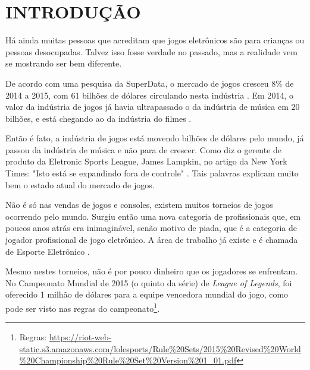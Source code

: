 \documentclass[
	12pt,					%
	openright,				%
	oneside,				%
	a4paper,				%
	bibjustif,				%
	chapter=TITLE,			%
	english,				%
	brazil,					%
	]{abntex2}
\begin{document}

\newpage %
\renewcommand*\listfigurename{LISTA DE FIGURAS}
\pdfbookmark[0]{\listfigurename}{lof}
\listoffigures*
\cleardoublepage

\newpage %
\thispagestyle{empty} %
\listoftables*
\cleardoublepage

\newpage %
\thispagestyle{empty} %
\tableofcontents*
\cleardoublepage

\textual
\newpage %
\chapter{INTRODUÇÃO}
	Há ainda muitas pessoas que acreditam que jogos eletrônicos são para crianças ou pessoas desocupadas.
	Talvez isso fosse verdade no passado, mas a realidade vem se mostrando ser bem diferente.
	
	De acordo com uma pesquisa da SuperData,
	o mercado de jogos cresceu 8\% de 2014 a 2015,
	com 61 bilhões de dólares circulando nesta indústria \cite{cnbc}.
	Em 2014, o valor da indústria de jogos já havia ultrapassado o da indústria de música em 20 bilhões,
	e está chegando ao da indústria do filmes \cite{nytimes}.
	
	Então é fato, a indústria de jogos está movendo bilhões de dólares pelo mundo,
	já passou da indústria de música e não para de crescer.
	Como diz o gerente de produto da Eletronic Sports League, James Lampkin,
	no artigo da New York Times:
	"Isto está se expandindo fora de controle"{}
	\cite[tradução nossa]{nytimes}.
	Tais palavras explicam muito bem o estado atual do mercado de jogos.
	
	Não é só nas vendas de jogos e consoles,
	existem muitos torneios de jogos ocorrendo pelo mundo.
	Surgiu então uma nova categoria de profissionais que,
	em poucos anos atrás era inimaginável, senão motivo de piada,
	que é a categoria de jogador profissional de jogo eletrônico.
	A área de trabalho já existe e é chamada de Esporte Eletrônico \cite{nytimes}.
	
	Mesmo nestes torneios, não é por pouco dinheiro que os jogadores se enfrentam.
	No Campeonato Mundial de 2015 (o quinto da série) de \textit{League of Legends},
	foi oferecido 1 milhão de dólares para a equipe vencedora mundial do jogo,
	como pode ser visto nas regras do campeonato\footnote{Regras: \url{https://riot-web-static.s3.amazonaws.com/lolesports/Rule\%20Sets/2015\%20Revised\%20World\%20Championship\%20Rule\%20Set\%20Version\%201\_01.pdf}}.
	
\end{document}
